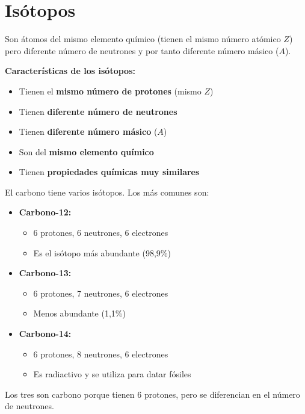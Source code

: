 \section{Isótopos}
\begin{definition}[isótopos]
    Son átomos del mismo elemento químico (tienen el mismo número atómico \( Z \)) pero diferente número de neutrones y por tanto diferente número másico (\( A \)).
\end{definition}
\textbf{Características de los isótopos:}
\begin{itemize}
    \item Tienen el \textbf{mismo número de protones} (mismo \( Z \))
    \item Tienen \textbf{diferente número de neutrones}
    \item Tienen \textbf{diferente número másico} (\( A \))
    \item Son del \textbf{mismo elemento químico}
    \item Tienen \textbf{propiedades químicas muy similares}
\end{itemize}
\begin{example}
    El carbono tiene varios isótopos. Los más comunes son:
    \begin{itemize}
        \item \textbf{Carbono-12:} 
        \begin{itemize}
            \item 6 protones, 6 neutrones, 6 electrones
            \item Es el isótopo más abundante (98,9\%)
        \end{itemize}

        \item \textbf{Carbono-13:} 
        \begin{itemize}
            \item 6 protones, 7 neutrones, 6 electrones
            \item Menos abundante (1,1\%)
        \end{itemize}
        \item \textbf{Carbono-14:} 
        \begin{itemize}
            \item 6 protones, 8 neutrones, 6 electrones
            \item Es radiactivo y se utiliza para datar fósiles
        \end{itemize}
    \end{itemize}
    Los tres son carbono porque tienen 6 protones, pero se diferencian en el número de neutrones.
\end{example}

